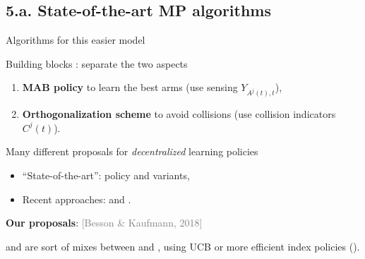 \documentclass[12pt,english,ignorenonframetext,aspectratio=169,]{beamer}
\providecommand{\tightlist}{%
  \setlength{\itemsep}{0pt}\setlength{\parskip}{0pt}}
\begin{document}
\subsection{\hfill{}5.a. State-of-the-art MP algorithms\hfill{}}

\begin{frame}{Algorithms for this easier model}

\begin{block}{Building blocks : separate the two aspects}

\begin{enumerate}
\def\labelenumi{\arabic{enumi}.}
\tightlist
\item
  \textbf{MAB policy} to learn the best arms (use sensing
  \(Y_{A^j(t),t}\)),
\item
  \textbf{Orthogonalization scheme} to avoid collisions (use collision indicators
  \(C^j(t)\)).
\end{enumerate}

\end{block}

\begin{block}{Many different proposals for \emph{decentralized} learning
policies}

\begin{itemize}
\tightlist
\item
  ``State-of-the-art'': \rhoRand{} policy and variants,
  \citationright{[Anandkumar et al, 2011]}
\item
  Recent approaches: \MEGA{} and \MusicalChair{}.
\end{itemize}

\end{block}

\begin{block}{\textbf{Our proposals}:
\hfill{}\textcolor{gray}{[Besson \& Kaufmann, 2018]}}

  \RandTopM{} and \MCTopM{} are sort of mixes
  between \rhoRand{} and \MusicalChair, using UCB or more
  efficient index policies (\klUCB).

\end{block}

\end{frame}



\end{document}
